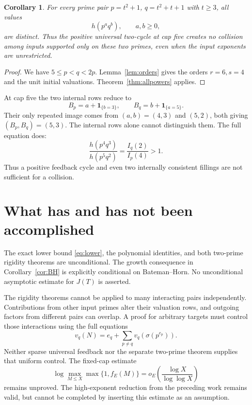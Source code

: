 \documentclass[11pt]{article}
\newtheorem{corollary}[theorem]{Corollary}
\begin{document}
\begin{corollary}\label{cor:familyrigid}
For every prime pair $p=t^2+1$, $q=t^2+t+1$ with $t\ge3$, all values
\[
 \boxed{h(p^a q^b),\qquad a,b\ge0,}
\]
are distinct. Thus the positive universal two-cycle at cap five creates no collision among inputs supported only on these two primes, even when the input exponents are unrestricted.
\end{corollary}
\begin{proof}
We have $5\le p<q<2p$. Lemma~\ref{lem:orders} gives the orders $r=6,s=4$ and the unit initial valuations. Theorem~\ref{thm:allpowers} applies.
\end{proof}

At cap five the two internal rows reduce to
\[
 B_p=a+\mathbf1_{\{b=3\}},\qquad
 B_q=b+\mathbf1_{\{a=5\}}.
\]
Their only repeated image comes from $(a,b)=(4,3)$ and $(5,2)$, both giving $(B_p,B_q)=(5,3)$. The internal rows alone cannot distinguish them. The full equation does:
\[
 \frac{h(p^4q^3)}{h(p^5q^2)}
 =\frac{I_q(2)}{I_p(4)}>1.
\]
Thus a positive feedback cycle and even two internally consistent fillings are not sufficient for a collision.

\section{What has and has not been accomplished}
The exact lower bound \eqref{eq:lower}, the polynomial identities, and both two-prime rigidity theorems are unconditional. The growth consequence in Corollary~\ref{cor:BH} is explicitly conditional on Bateman--Horn. No unconditional asymptotic estimate for $J(T)$ is asserted.

The rigidity theorems cannot be applied to many interacting pairs independently. Contributions from other input primes alter their valuation rows, and outgoing factors from different pairs can overlap. A proof for arbitrary targets must control those interactions using the full equations
\[
 v_q(N)=e_q+\sum_{p\ne q}v_q(\sigma(p^{e_p})).
\]
Neither sparse universal feedback nor the separate two-prime theorem supplies that uniform control. The fixed-cap estimate
\[
 \log\max_{M\le X}\max\{1,f_E(M)\}
 =o_E\!\left(\frac{\log X}{\log\log X}\right)
\]
remains unproved. The high-exponent reduction from the preceding work remains valid, but cannot be completed by inserting this estimate as an assumption.
\end{document}
